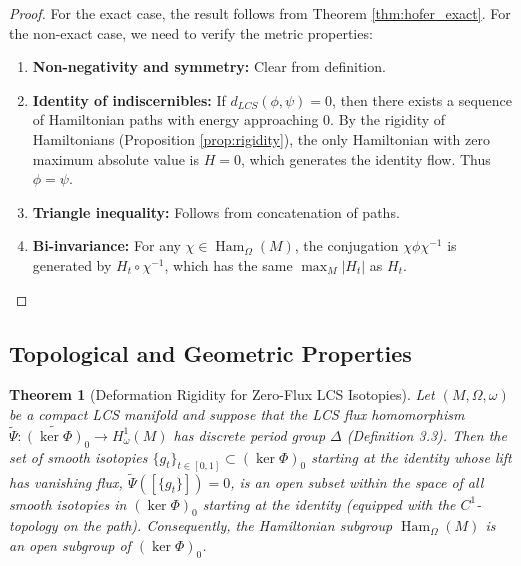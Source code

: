 \documentclass[11pt,a4paper]{amsart}
\newtheorem{theorem}{Theorem}[section]
\theoremstyle{definition}
\theoremstyle{remark}
\newcommand{\Ham}{\operatorname{Ham}}
\begin{document}
	\begin{proof}
		For the exact case, the result follows from Theorem \ref{thm:hofer_exact}. For the non-exact case, we need to verify the metric properties:
		\begin{enumerate}
			\item \textbf{Non-negativity and symmetry:} Clear from definition.
			\item \textbf{Identity of indiscernibles:} If $d_{LCS}(\phi,\psi)=0$, then there exists a sequence of Hamiltonian paths with energy approaching 0. By the rigidity of Hamiltonians (Proposition \ref{prop:rigidity}), the only Hamiltonian with zero maximum absolute value is $H=0$, which generates the identity flow. Thus $\phi=\psi$.
			\item \textbf{Triangle inequality:} Follows from concatenation of paths.
			\item \textbf{Bi-invariance:} For any $\chi \in \Ham_\Omega(M)$, the conjugation $\chi\phi\chi^{-1}$ is generated by $H_t \circ \chi^{-1}$, which has the same $\max_M |H_t|$ as $H_t$.
		
		\end{enumerate}
	\end{proof}
	
	\subsection{Topological and Geometric Properties}
	
	\begin{theorem}[Deformation Rigidity for Zero-Flux LCS Isotopies] \label{thm:deformation_rigidity}
		Let $(M, \Omega, \omega)$ be a compact LCS manifold and suppose that the LCS flux homomorphism $\widetilde{\Psi} : \widetilde{(\ker \Phi)}_0 \to H_\omega^1(M)$ has discrete period group $\Delta$ (Definition 3.3). Then the set of smooth isotopies $\{g_t\}_{t \in [0,1]} \subset (\ker \Phi)_0$ starting at the identity whose lift has vanishing flux, $\widetilde{\Psi}([\{g_t\}]) = 0$, is an open subset within the space of all smooth isotopies in $(\ker \Phi)_0$ starting at the identity (equipped with the $C^1$-topology on the path). Consequently, the Hamiltonian subgroup $\Ham_\Omega(M)$ is an open subgroup of $(\ker \Phi)_0$.
	\end{theorem}
	
\end{document}
